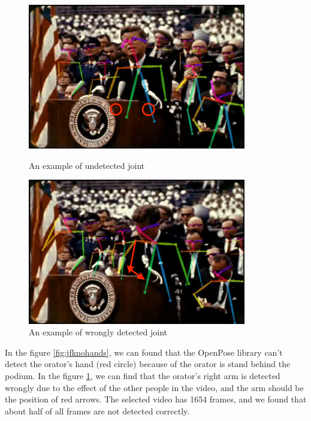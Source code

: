 \begin{figure}[!htbp]
\centering
\begin{minipage}[t]{0.48\textwidth}
\centering
\includegraphics[width=0.85\textwidth]{./img/jfknohands.png}
\caption{An example of undetected joint}
\label{fig:jfknohands}
\end{minipage}
\begin{minipage}[t]{0.48\textwidth}
\centering
\includegraphics[width=0.85\textwidth]{./img/jfkwrong.png}
\caption{An example of wrongly detected joint}
\label{fig:jfkwrong}
\end{minipage}
\end{figure}
\par In the figure \ref{fig:jfknohands}, we can found that the OpenPose library can't detect the orator's hand (red circle) because of the orator is stand behind the podium. In the figure \ref{fig:jfkwrong}, we can find that the orator's right arm is detected wrongly due to the effect of the other people in the video, and the arm should be the position of red arrows. The selected video has 1654 frames, and we found that about half of all frames are not detected correctly.


